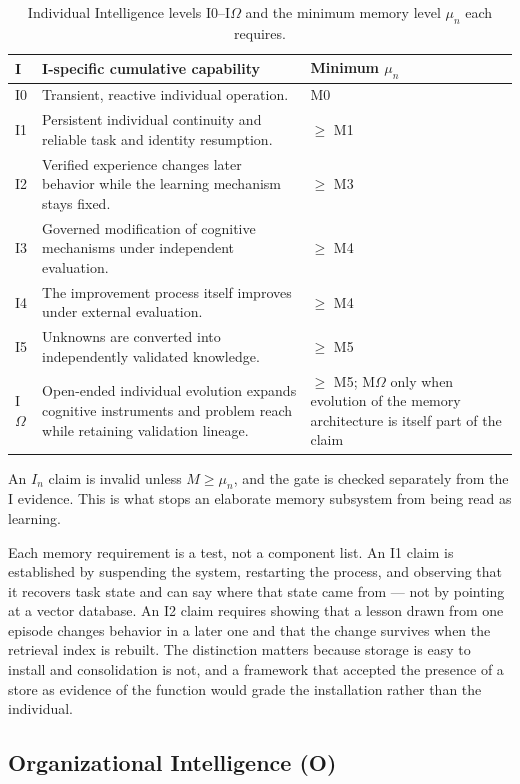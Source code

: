 \documentclass[11pt]{article}
\theoremstyle{definition}
\newcommand{\Om}{\ensuremath{\Omega}}
\begin{document}
\begin{table}[H]
\centering\small
\begin{tabularx}{\textwidth}{@{}lYl@{}}
\toprule
I & I-specific cumulative capability & Minimum $\mu_n$ \\
\midrule
I0 & Transient, reactive individual operation. & M0 \\
I1 & Persistent individual continuity and reliable task and identity resumption. & $\ge$ M1 \\
I2 & Verified experience changes later behavior while the learning mechanism stays fixed. & $\ge$ M3 \\
I3 & Governed modification of cognitive mechanisms under independent evaluation. & $\ge$ M4 \\
I4 & The improvement process itself improves under external evaluation. & $\ge$ M4 \\
I5 & Unknowns are converted into independently validated knowledge. & $\ge$ M5 \\
I\Om{} & Open-ended individual evolution expands cognitive instruments and problem reach while retaining validation lineage. & $\ge$ M5; M\Om{} only when evolution of the memory architecture is itself part of the claim \\
\bottomrule
\end{tabularx}
\caption{Individual Intelligence levels I0--I\Om{} and the minimum memory level $\mu_n$ each requires.}
\label{tab:i}
\end{table}

An $I_n$ claim is invalid unless $M \ge \mu_n$, and the gate is checked separately from the I evidence. This is what stops an elaborate memory subsystem from being read as learning.

Each memory requirement is a test, not a component list. An I1 claim is established by suspending the system, restarting the process, and observing that it recovers task state and can say where that state came from --- not by pointing at a vector database. An I2 claim requires showing that a lesson drawn from one episode changes behavior in a later one and that the change survives when the retrieval index is rebuilt. The distinction matters because storage is easy to install and consolidation is not, and a framework that accepted the presence of a store as evidence of the function would grade the installation rather than the individual.

\subsection{Organizational Intelligence (O)}
\end{document}

